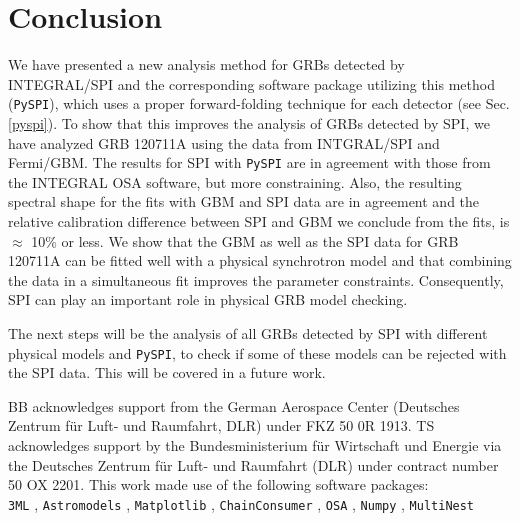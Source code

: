 \documentclass[twocolumn,traditabstract]{aa}
\begin{document}
\section{Conclusion}
\label{conclusion}
We have presented a new analysis method for GRBs detected by INTEGRAL/SPI and the corresponding software package utilizing this method ({\tt PySPI}), which uses a proper forward-folding technique for each detector (see Sec. \ref{pyspi}). To show that this improves the analysis of GRBs detected by SPI, we have analyzed GRB 120711A using the data from INTGRAL/SPI and Fermi/GBM. The results for SPI with {\tt PySPI} are in agreement with those from the INTEGRAL OSA software, but more constraining. Also, the resulting spectral shape for the fits with GBM and SPI data are in agreement and the relative calibration difference between SPI and GBM we conclude from the fits, is $\approx$ 10\% or less. We show that the GBM as well as the SPI data for GRB 120711A can be fitted well with a physical synchrotron model and that combining the data in a simultaneous fit improves the parameter constraints. Consequently, SPI can play an important role in physical GRB model checking.

The next steps will be the analysis of all GRBs detected by SPI with different physical models and {\tt PySPI}, to check if some of these models can be rejected with the SPI data. This will be covered in a future work.

\begin{acknowledgement}
BB acknowledges support from the German Aerospace Center (Deutsches Zentrum f\"ur Luft- und Raumfahrt, DLR) under FKZ 50 0R 1913. TS acknowledges support by the Bundesministerium f\"ur Wirtschaft und Energie via the Deutsches Zentrum f\"ur Luft- und Raumfahrt (DLR) under contract number 50 OX 2201.
This work made use of the following software packages:\\
{\tt 3ML} \citep{3ML}, {\tt Astromodels} \citep{astromodels}, {\tt Matplotlib} \citep{matplotlib}, {\tt ChainConsumer} \citep{chainconsumer, chainconsumer2}, {\tt OSA} \citep{osa}, {\tt Numpy} \citep{numpy}, {\tt MultiNest} \citep{multinest, multinest1, multinest3}
\end{acknowledgement}
\end{document}
